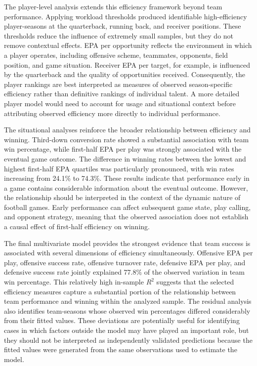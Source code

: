 \documentclass[11pt]{article}
\begin{document}
The player-level analysis extends this efficiency framework beyond team performance. Applying workload thresholds produced identifiable high-efficiency player-seasons at the quarterback, running back, and receiver positions. These thresholds reduce the influence of extremely small samples, but they do not remove contextual effects. EPA per opportunity reflects the environment in which a player operates, including offensive scheme, teammates, opponents, field position, and game situation. Receiver EPA per target, for example, is influenced by the quarterback and the quality of opportunities received. Consequently, the player rankings are best interpreted as measures of observed season-specific efficiency rather than definitive rankings of individual talent. A more detailed player model would need to account for usage and situational context before attributing observed efficiency more directly to individual performance.

The situational analyses reinforce the broader relationship between efficiency and winning. Third-down conversion rate showed a substantial association with team win percentage, while first-half EPA per play was strongly associated with the eventual game outcome. The difference in winning rates between the lowest and highest first-half EPA quartiles was particularly pronounced, with win rates increasing from 24.1\% to 74.3\%. These results indicate that performance early in a game contains considerable information about the eventual outcome. However, the relationship should be interpreted in the context of the dynamic nature of football games. Early performance can affect subsequent game state, play calling, and opponent strategy, meaning that the observed association does not establish a causal effect of first-half efficiency on winning.

The final multivariate model provides the strongest evidence that team success is associated with several dimensions of efficiency simultaneously. Offensive EPA per play, offensive success rate, offensive turnover rate, defensive EPA per play, and defensive success rate jointly explained 77.8\% of the observed variation in team win percentage. This relatively high in-sample $R^2$ suggests that the selected efficiency measures capture a substantial portion of the relationship between team performance and winning within the analyzed sample. The residual analysis also identifies team-seasons whose observed win percentages differed considerably from their fitted values. These deviations are potentially useful for identifying cases in which factors outside the model may have played an important role, but they should not be interpreted as independently validated predictions because the fitted values were generated from the same observations used to estimate the model.
\end{document}

